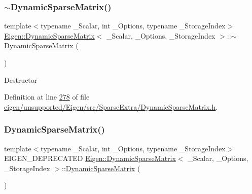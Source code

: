 \subsubsection{\texorpdfstring{$\sim$\+Dynamic\+Sparse\+Matrix()}{~DynamicSparseMatrix()}\hspace{0.1cm}{\footnotesize\ttfamily [1/2]}}
{\footnotesize\ttfamily template$<$typename \+\_\+\+Scalar, int \+\_\+\+Options, typename \+\_\+\+Storage\+Index$>$ \\
\hyperlink{class_eigen_1_1_dynamic_sparse_matrix}{Eigen\+::\+Dynamic\+Sparse\+Matrix}$<$ \+\_\+\+Scalar, \+\_\+\+Options, \+\_\+\+Storage\+Index $>$\+::$\sim$\hyperlink{class_eigen_1_1_dynamic_sparse_matrix}{Dynamic\+Sparse\+Matrix} (\begin{DoxyParamCaption}{ }\end{DoxyParamCaption})\hspace{0.3cm}{\ttfamily [inline]}}

Destructor 

Definition at line \hyperlink{eigen_2unsupported_2_eigen_2src_2_sparse_extra_2_dynamic_sparse_matrix_8h_source_l00278}{278} of file \hyperlink{eigen_2unsupported_2_eigen_2src_2_sparse_extra_2_dynamic_sparse_matrix_8h_source}{eigen/unsupported/\+Eigen/src/\+Sparse\+Extra/\+Dynamic\+Sparse\+Matrix.\+h}.

\mbox{\label{class_eigen_1_1_dynamic_sparse_matrix_a46a6947fcf115e6b7b731a8e01e7995d}} 
\subsubsection{\texorpdfstring{Dynamic\+Sparse\+Matrix()}{DynamicSparseMatrix()}\hspace{0.1cm}{\footnotesize\ttfamily [4/6]}}
{\footnotesize\ttfamily template$<$typename \+\_\+\+Scalar, int \+\_\+\+Options, typename \+\_\+\+Storage\+Index$>$ \\
E\+I\+G\+E\+N\+\_\+\+D\+E\+P\+R\+E\+C\+A\+T\+ED \hyperlink{class_eigen_1_1_dynamic_sparse_matrix}{Eigen\+::\+Dynamic\+Sparse\+Matrix}$<$ \+\_\+\+Scalar, \+\_\+\+Options, \+\_\+\+Storage\+Index $>$\+::\hyperlink{class_eigen_1_1_dynamic_sparse_matrix}{Dynamic\+Sparse\+Matrix} (\begin{DoxyParamCaption}{ }\end{DoxyParamCaption})\hspace{0.3cm}{\ttfamily [inline]}}

